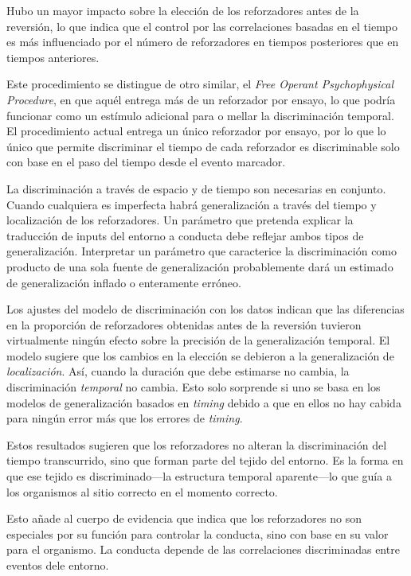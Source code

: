 \documentclass[a4paper,12pt]{article}
\begin{document}
Hubo un mayor impacto sobre la elección de los reforzadores antes de la reversión, lo que indica que el control por las correlaciones basadas en el tiempo es más influenciado por el número de reforzadores en tiempos posteriores que en tiempos anteriores.

Este procedimiento se distingue de otro similar, el {\itshape Free Operant Psychophysical Procedure}, en que aquél entrega más de un reforzador por ensayo, lo que podría funcionar como un estímulo adicional para o mellar la discriminación temporal.
El procedimiento actual entrega un único reforzador por ensayo, por lo que lo único que permite discriminar el tiempo de cada reforzador es discriminable solo con base en el paso del tiempo desde el evento marcador.

La discriminación a través de espacio y de tiempo son necesarias en conjunto.
Cuando cualquiera es imperfecta habrá generalización a través del tiempo y localización de los reforzadores.
Un parámetro que pretenda explicar la traducción de inputs del entorno a conducta debe reflejar ambos tipos de generalización.
Interpretar un parámetro que caracterice la discriminación como producto de una sola fuente de generalización probablemente dará un estimado de generalización inflado o enteramente erróneo.

Los ajustes del modelo de discriminación con los datos indican que las diferencias en la proporción de reforzadores obtenidas antes de la reversión tuvieron virtualmente ningún efecto sobre la precisión de la generalización temporal.
El modelo sugiere que los cambios en la elección se debieron a la generalización de {\itshape localización}.
Así, cuando la duración que debe estimarse no cambia, la discriminación {\itshape temporal} no cambia.
Esto solo sorprende si uno se basa en los modelos de generalización basados en {\itshape timing} debido a que en ellos no hay cabida para ningún error más que los errores de {\itshape timing}.

Estos resultados sugieren que los reforzadores no alteran la discriminación del tiempo transcurrido, sino que forman parte del tejido del entorno. Es la forma en que ese tejido es discriminado---la estructura temporal aparente---lo que guía a los organismos al sitio correcto en el momento correcto.

Esto añade al cuerpo de evidencia que indica que los reforzadores no son especiales por su función para controlar la conducta, sino con base en su valor para el organismo. La conducta depende de las correlaciones discriminadas entre eventos dele entorno.
\end{document}
